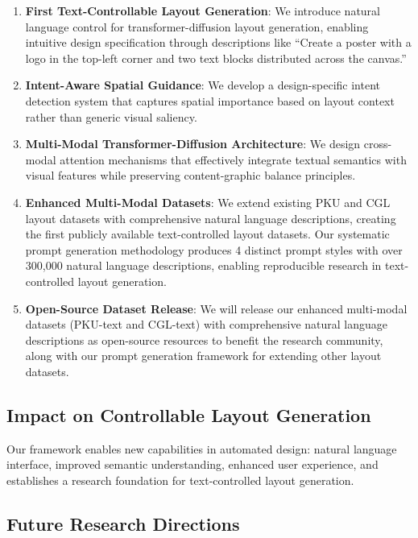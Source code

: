 \documentclass[journal,article,submit,pdftex,moreauthors]{Definitions/mdpi}
\begin{document}
\begin{enumerate}
\item \textbf{First Text-Controllable Layout Generation}: We introduce natural language control for transformer-diffusion layout generation, enabling intuitive design specification through descriptions like ``Create a poster with a logo in the top-left corner and two text blocks distributed across the canvas.''

\item \textbf{Intent-Aware Spatial Guidance}: We develop a design-specific intent detection system that captures spatial importance based on layout context rather than generic visual saliency.

\item \textbf{Multi-Modal Transformer-Diffusion Architecture}: We design cross-modal attention mechanisms that effectively integrate textual semantics with visual features while preserving content-graphic balance principles.

\item \textbf{Enhanced Multi-Modal Datasets}: We extend existing PKU and CGL layout datasets with comprehensive natural language descriptions, creating the first publicly available text-controlled layout datasets. Our systematic prompt generation methodology produces 4 distinct prompt styles with over 300,000 natural language descriptions, enabling reproducible research in text-controlled layout generation.

\item \textbf{Open-Source Dataset Release}: We will release our enhanced multi-modal datasets (PKU-text and CGL-text) with comprehensive natural language descriptions as open-source resources to benefit the research community, along with our prompt generation framework for extending other layout datasets.
\end{enumerate}

\subsection{Impact on Controllable Layout Generation}

Our framework enables new capabilities in automated design: natural language interface, improved semantic understanding, enhanced user experience, and establishes a research foundation for text-controlled layout generation.

\subsection{Future Research Directions}
\end{document}
